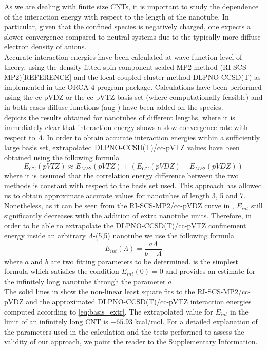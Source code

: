 \documentclass[utf8]{article}
\begin{document}
As we are dealing with finite size CNTs, it is important to study the dependence of the interaction energy with respect to the length of the nanotube. In particular, given that the confined species is negatively charged, one expects a slower convergence compared to neutral systems due to the typically more diffuse electron density of anions.\\
Accurate interaction energies have been calculated at wave function level of theory, using the density-fitted spin-component-scaled MP2 method (RI-SCS-MP2)[REFERENCE] and the local coupled cluster method DLPNO-CCSD(T) as implemented in the ORCA 4 program package\cite{Riplinger2013,Riplinger2016}. Calculations have been performed using the cc-pVDZ or the cc-pVTZ basis set (where computationally feasible) and in both cases diffuse functions (aug-) have been added on the \ntm species.\\
 depicts the results obtained for nanotubes of different lengths, where it is immediately clear that interaction energy shows a slow convergence rate with respect to $\Lambda$.
In order to obtain accurate interaction energies within a sufficiently large basis set, extrapolated DLPNO-CCSD(T)/cc-pVTZ values have been obtained using the following formula
%
\begin{equation}
    E_{CC}(pVTZ) \approx E_{MP2}(pVTZ) + (E_{CC}(pVDZ) - E_{MP2}(pVDZ)) \label{eq:basis_extr}
\end{equation}
%
where it is assumed that the correlation energy difference between the two methods is constant with respect to the basis set used.
This approach has allowed us to obtain approximate accurate values for nanotubes of length 3, 5 and 7. Nonetheless, as it can be seen from the RI-SCS-MP2/cc-pVDZ curve in , $E_{int}$ still significantly decreases with the addition of extra nanotube units.
Therefore, in order to be able to extrapolate the DLPNO-CCSD(T)/cc-pVTZ confinement energy inside an arbitrary $\Lambda$-(5,5) nanotube we use the following formula
%
\begin{equation}
    E_{int}(\Lambda) = \frac{a\Lambda}{b + \Lambda} \label{eq:length_extr}
\end{equation} 
%
where $a$ and $b$ are two fitting parameters to be determined.
 is the simplest formula which satisfies the condition $E_{int}(0) = 0$ and provides an estimate for the infinitely long nanotube through the parameter $a$.\\
The solid lines in  show the non-linear least square fits to the RI-SCS-MP2/cc-pVDZ and the approximated DLPNO-CCSD(T)/cc-pVTZ interaction energies computed according to \cref{eq:basis_extr}.
The extrapolated value for $E_{int}$ in the limit of an infinitely long CNT is $-65.93$ kcal/mol.
For a detailed explanation of the parameters used in the calculation and the tests performed to assess the validity of our approach, we point the reader to the Supplementary Information.\\
\end{document}
